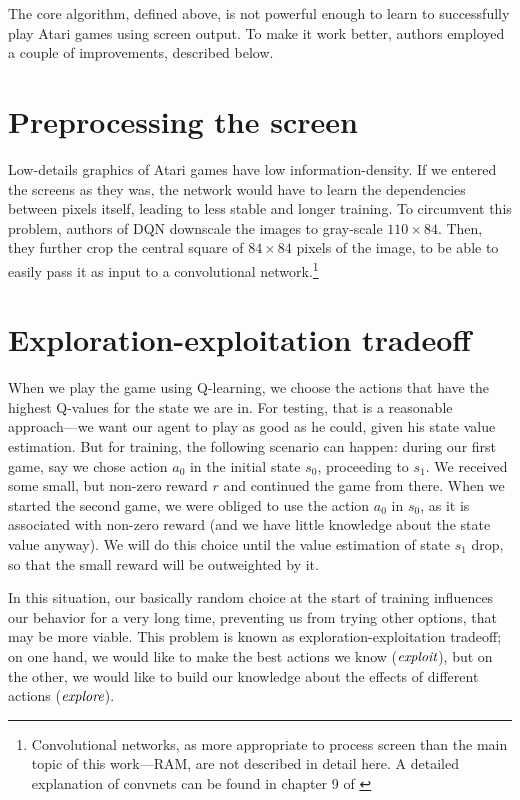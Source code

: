 The core algorithm, defined above, is not powerful enough to learn to successfully play Atari games using screen output. To make it work better, authors employed a couple of improvements, described below.

\section{Preprocessing the screen}
Low-details graphics of Atari games have low information-density. If we entered the screens as they was, the network would have to learn the dependencies between pixels itself, leading to less stable and longer training. To circumvent this problem, authors of DQN downscale the images to gray-scale $110 \times 84$. Then, they further crop the central square of $84 \times 84$ pixels of the image, to be able to easily pass it as input to a convolutional network.\footnote{Convolutional networks, as more appropriate to process screen than the main topic of this work---RAM, are not described in detail here. A detailed explanation of convnets can be found in chapter 9 of \cite{dlbook}}

\section{Exploration-exploitation tradeoff}
When we play the game using Q-learning, we choose the actions that have the highest Q-values for the state we are in. For testing, that is a reasonable approach---we want our agent to play as good as he could, given his state value estimation. But for training, the following scenario can happen: during our first game, say we chose action $a_0$ in the initial state $s_0$, proceeding to $s_1$. We received some small, but non-zero reward $r$ and continued the game from there. When we started the second game, we were obliged to use the action $a_0$ in $s_0$, as it is associated with non-zero reward (and we have little knowledge about the state value anyway). We will do this choice until the value estimation of state $s_1$ drop, so that the small reward will be outweighted by it.

In this situation, our basically random choice at the start of training influences our behavior for a very long time, preventing us from trying other options, that may be more viable. This problem is known as exploration-exploitation tradeoff; on one hand, we would like to make the best actions we know ($\emph{exploit}$), but on the other, we would like to build our knowledge about the effects of different actions ($\emph{explore}$).

